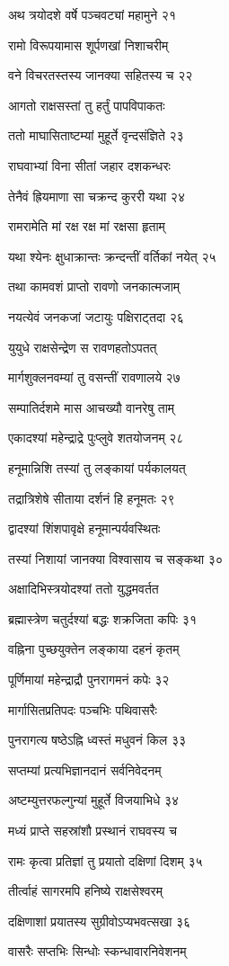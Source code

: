 अथ त्रयोदशे वर्षे पञ्चवट्यां महामुने २१

रामो विरूपयामास शूर्पणखां निशाचरीम्

वने विचरतस्तस्य जानक्या सहितस्य च २२

आगतो राक्षसस्तां तु हर्तुं पापविपाकतः

ततो माघासिताष्टम्यां मुहूर्ते वृन्दसंज्ञिते २३

राघवाभ्यां विना सीतां जहार दशकन्धरः

तेनैवं ह्रियमाणा सा चक्रन्द कुररी यथा २४

रामरामेति मां रक्ष रक्ष मां रक्षसा हृताम्

यथा श्येनः क्षुधाक्रान्तः क्रन्दन्तीं वर्तिकां नयेत् २५

तथा कामवशं प्राप्तो रावणो जनकात्मजाम्

नयत्येवं जनकजां जटायुः पक्षिराट्तदा २६

युयुधे राक्षसेन्द्रेण स रावणहतोऽपतत्

मार्गशुक्लनवम्यां तु वसन्तीं रावणालये २७

सम्पातिर्दशमे मास आचख्यौ वानरेषु ताम्

एकादश्यां महेन्द्राद्रे पुःप्लुवे शतयोजनम् २८

हनूमान्निशि तस्यां तु लङ्कायां पर्यकालयत्

तद्रात्रिशेषे सीताया दर्शनं हि हनूमतः २९

द्वादश्यां शिंशपावृक्षे हनूमान्पर्यवस्थितः

तस्यां निशायां जानक्या विश्वासाय च सङ्कथा ३०

अक्षादिभिस्त्रयोदश्यां ततो युद्धमवर्तत

ब्रह्मास्त्रेण चतुर्दश्यां बद्धः शक्रजिता कपिः ३१

वह्निना पुच्छयुक्तेन लङ्काया दहनं कृतम्

पूर्णिमायां महेन्द्राद्रौ पुनरागमनं कपेः ३२

मार्गासितप्रतिपदः पञ्चभिः पथिवासरैः

पुनरागत्य षष्ठेऽह्नि ध्वस्तं मधुवनं किल ३३

सप्तम्यां प्रत्यभिज्ञानदानं सर्वनिवेदनम्

अष्टम्युत्तरफल्गुन्यां मुहूर्ते विजयाभिधे ३४

मध्यं प्राप्ते सहस्रांशौ प्रस्थानं राघवस्य च

रामः कृत्वा प्रतिज्ञां तु प्रयातो दक्षिणां दिशम् ३५

तीर्त्वाहं सागरमपि हनिष्ये राक्षसेश्वरम्

दक्षिणाशां प्रयातस्य सुग्रीवोऽप्यभवत्सखा ३६

वासरैः सप्तभिः सिन्धोः स्कन्धावारनिवेशनम्

